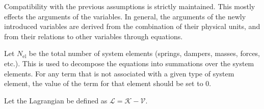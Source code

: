 \documentclass[11pt]{article}
\begin{document}
Compatibility with the previous assumptions is strictly maintained. This mostly effects the arguments of the variables. In general, the arguments of the newly introduced variables are derived from the combination of their physical units, and from their relations to other variables through equations.

Let $N_\mathrm{el}$ be the total number of system elements (springs, dampers, masses, forces, etc.). This is used to decompose the equations into summations over the system elements. For any term that is not associated with a given type of system element, the value of the term for that element should be set to $0$.

Let the Lagrangian be defined as $\mathcal{L}=\mathcal{K}-\mathcal{V}$.

\end{document}
